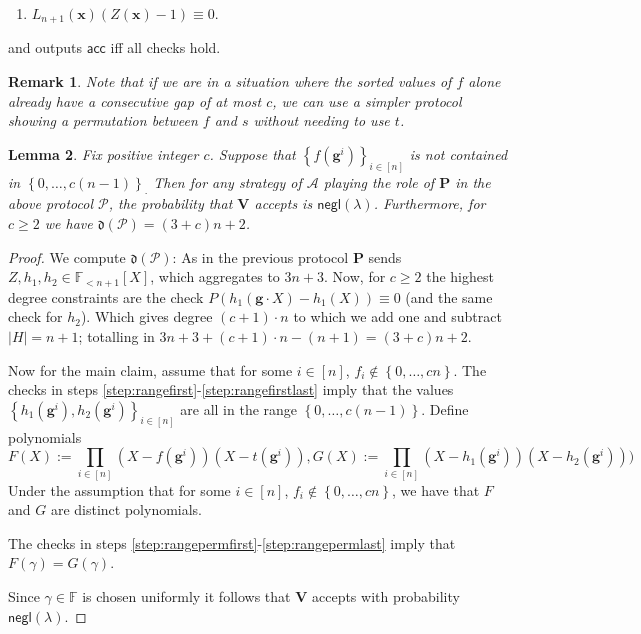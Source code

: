\documentclass[11pt]{article} %
\newcommand{\F}{\ensuremath{\mathbb F}\xspace}
\newcommand{\adv}{\ensuremath{\mathcal A}\xspace}
\newcommand{\negl}{\ensuremath{\mathsf{negl}(\lambda)}\xspace}
\newcommand{\acc}{\ensuremath{\mathsf{acc}}\xspace}
\newcommand{\defeq}{:=}
\newcommand{\sett}[2]{\ensuremath{\set{#1}_{#2}}\xspace}
\newcommand{\prv}{\ensuremath{\mathsf{\mathbf{P}}}\xspace}
\newcommand{\prvpoly}{\ensuremath{\prv}\xspace}
\newcommand{\verpoly}{\ensuremath{\ver}\xspace}%
\newcommand{\ver}{\ensuremath{\mathsf{\mathbf{V}}}\xspace}
\newcommand{\set}[1]{\ensuremath{\left\{#1\right\}}\xspace}
\newcommand{\hgen}{\ensuremath{\mathbf{g}}\xspace}
\newcommand{\polysofdeg}[1]{\ensuremath{\F_{< #1}[X]}\xspace}
\newcommand{\prot}{\ensuremath{\mathscr{P}}\xspace}
\newcommand{\aggdeg}[1]{\ensuremath{\mathfrak{d}(#1)}\xspace}
\newtheorem{lemma}{Lemma}[section]
\newtheorem{remark}[lemma]{Remark}
\newcommand{\sone}{\ensuremath{ h_1}\xspace}
\newcommand{\stwo}{\ensuremath{ h_{2}}\xspace}
\newcommand{\X}{\ensuremath{ {\mathbf{x}}}\xspace}
\begin{document}
\begin{enumerate}
\begin{enumerate}
\item \label{step:rangepermlast}$L_{n+1}(\X)(Z(\X)-1)\equiv 0$.
 
 \end{enumerate}

 and outputs \acc iff all checks hold.
\end{enumerate}
\begin{remark}
 Note that if we are in a situation where the sorted values of $f$ alone already have a consecutive gap of at most $c$, we can use a simpler protocol showing a permutation between $f$ and $s$ without needing to use $t$.
\end{remark}



\begin{lemma}\label{lem:rangeprot}
Fix positive integer $c$.
 Suppose that $\sett{f(\hgen^i)}{i\in [n]}$ is not contained in  \sett{0,\ldots,c(n-1)}.
 Then for any strategy of \adv playing the role of \prvpoly in the above protocol \prot, the probability that \verpoly accepts is \negl.
 Furthermore, for $c\geq 2$ we have $\aggdeg{\prot} = (3+c)n+2$.
\end{lemma}


\begin{proof}
 We compute \aggdeg{\prot}:
 As in the previous protocol \prv sends $Z,\sone,\stwo \in \polysofdeg{n+1}$,
 which aggregates to $3n+3$.
 Now, for $c\geq 2$ the highest degree constraints are the check
 $P\left(\sone(\hgen\cdot X)- \sone(X)\right)\equiv 0$ (and the same check for \stwo).
 Which gives degree $(c+1)\cdot n$ to which we add one and subtract $|H|=n+1$;
 totalling in $3n+3+(c+1)\cdot n - (n+1) = (3+c)n+2$.
 
 Now for the main claim, assume that for some $i\in [n]$, $f_i \notin \set{0,\ldots,cn}$.
 The checks in steps \ref{step:rangefirst}-\ref{step:rangefirstlast} imply 
 that the values \sett{\sone(\hgen^i),\stwo(\hgen^i)}{i\in [n]} are all in the range \set{0,\ldots, c(n-1)}.
 Define polynomials 
 \[F(X) \defeq \prod_{i\in [n]} (X-f(\hgen^i))(X-t(\hgen^i)),
 G(X) \defeq \prod_{i\in [n]} (X-\sone(\hgen^i))(X-\stwo(\hgen^i)))
 \]
Under the assumption that for some $i\in [n]$, $f_i \notin \set{0,\ldots,cn}$,
we have that $F$ and $G$ are distinct polynomials.

The checks in steps \ref{step:rangepermfirst}-\ref{step:rangepermlast} imply
that $F(\gamma) = G(\gamma)$.

Since $\gamma \in \F$ is chosen uniformly it follows that \verpoly accepts with probability \negl.
 
 \end{proof}
\end{document}
